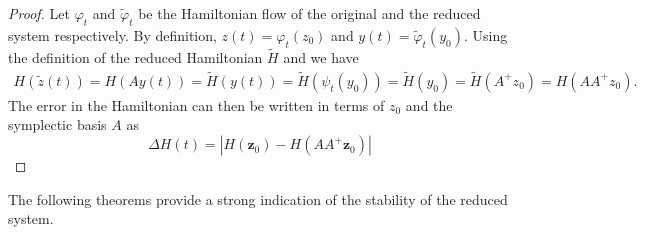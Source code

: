 \begin{proof}
	Let $\varphi_t$ and $\tilde \varphi_t$ be the Hamiltonian flow of the original and the reduced system respectively. By definition, $ z(t) = \varphi_t(z_0)$ and $ y(t) = \tilde \varphi_t(y_0)$. Using the definition of the reduced Hamiltonian $\tilde H$ and  we have
\begin{equation} \label{p1.eq:SyMo:6}
\begin{aligned}
	H(\tilde{{z}} (t)) = H( A y (t) ) = \tilde H( y (t)) = \tilde H(\psi_t( y_0)) = \tilde H( y_0) = \tilde H(A^+  z_0) = H(AA^+ z_0).
\end{aligned}
\end{equation}
The error in the Hamiltonian can then be written in terms of $z_0$ and the symplectic basis $A$ as
\begin{equation} \label{p1.eq:SyMo:7}
	\Delta H(t) = |H(\mathbf z_0) - H(AA^+\mathbf z_0)|
\end{equation}
\end{proof}
The following theorems provide a strong indication of the stability of the reduced system.

